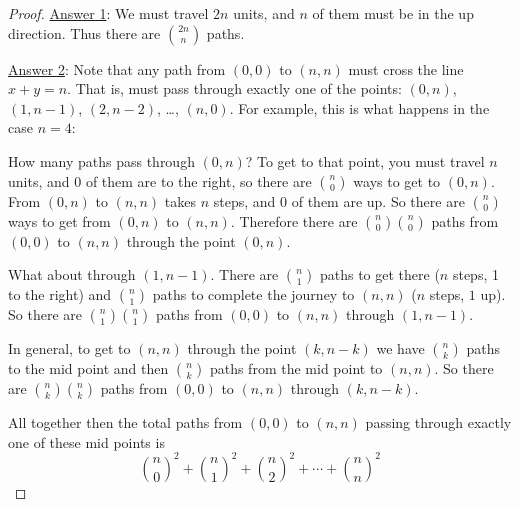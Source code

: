 \documentclass[12pt]{article}
\begin{document}
\begin{example}
\begin{solution}
\begin{proof}
      \underline{Answer 1}: We must travel $2n$ units, and $n$ of them must be in the up direction.  Thus there are ${2n \choose n}$ paths.
      
      \underline{Answer 2}: Note that any path from $(0,0)$ to $(n,n)$ must cross the line $x + y = n$.  That is, must pass through exactly one of the points: $(0,n)$, $(1,n-1)$, $(2,n-2)$, \ldots, $(n, 0)$.  For example, this is what happens in the case $n = 4$:
        
    \begin{center}
   \end{center}
     
     How many paths pass through $(0,n)$?  To get to that point, you must travel $n$ units, and $0$ of them are to the right, so there are ${n \choose 0}$ ways to get to $(0,n)$.  From $(0,n)$ to $(n,n)$ takes $n$ steps, and $0$ of them are up.  So there are ${n \choose 0}$ ways to get from $(0,n)$ to $(n,n)$.  Therefore there are ${n \choose 0}{n \choose 0}$ paths from $(0,0)$ to $(n,n)$ through the point $(0,n)$.  
     
     What about through $(1,n-1)$.  There are ${n \choose 1}$ paths to get there ($n$ steps, 1 to the right) and ${n \choose 1}$ paths to complete the journey to $(n,n)$ ($n$ steps, $1$ up).  So there are ${n \choose 1}{n \choose 1}$ paths from $(0,0)$ to $(n,n)$ through $(1,n-1)$.
     
     In general, to get to $(n,n)$ through the point $(k,n-k)$ we have ${n \choose k}$ paths to the mid point and then ${n \choose k}$ paths from the mid point to $(n,n)$.  So there are ${n \choose k}{n \choose k}$ paths from $(0,0)$ to $(n,n)$ through $(k, n-k)$.
     
     All together then the total paths from $(0,0)$ to $(n,n)$ passing through exactly one of these mid points is
     \[{n \choose 0}^2 + {n \choose 1}^2 + {n \choose 2}^2 + \cdots + {n \choose n}^2\]      
   \end{proof}
  \end{solution}
\end{example}
\end{document}
